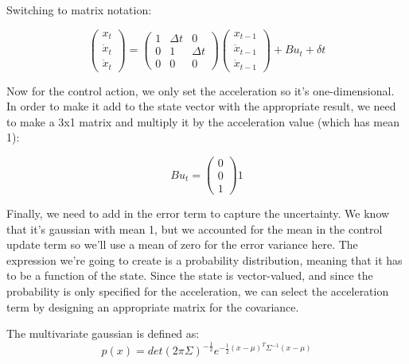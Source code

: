\documentclass[10pt]{article}
\begin{document}
\begin{enumerate}
\begin{enumerate}
  Switching to matrix notation:

  $$
  \begin{pmatrix} x_t \\ \dot{x}_t \\ \ddot{x}_t \end{pmatrix} = 
  \begin{pmatrix} 1 & \Delta t & 0 \\ 0 & 1 & \Delta t  \\ 0 & 0 & 0 \end{pmatrix} 
  \begin{pmatrix} x_{t-1} \\ \dot{x}_{t-1} \\ \ddot{x}_{t-1} \end{pmatrix} + B u_t + \delta t
  $$

  Now for the control action, we only set the acceleration so it's
  one-dimensional. In order to make it add to the state vector with the
  appropriate result, we need to make a 3x1 matrix and multiply it by the
  acceleration value (which has mean 1):

  $$ B u_t = \begin{pmatrix} 0 \\ 0 \\ 1 \end{pmatrix} 1$$

  Finally, we need to add in the error term to capture the uncertainty. We know
  that it's gaussian with mean 1, but we accounted for the mean in the control
  update term so we'll use a mean of zero for the error variance here. The
  expression we're going to create is a probability distribution, meaning that
  it has to be a function of the state. Since the state is vector-valued, and
  since the probability is only specified for the acceleration, we can select
  the acceleration term by designing an appropriate matrix for the covariance.

  The multivariate gaussian is defined as: 
  $$ p(x) = det(2\pi \Sigma)^{-\frac{1}{2}} e^{-\frac{1}{2} (x - \mu)^T
  \Sigma^{-1} (x - \mu)} $$

\end{enumerate}

\end{enumerate}
\end{document}
